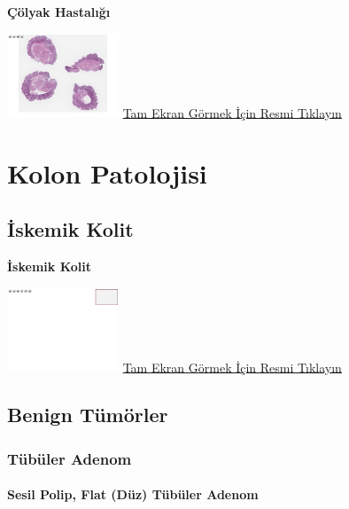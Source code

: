 \documentclass[
  letterpaper,
  DIV=11,
  numbers=noendperiod]{scrreprt}
\begin{document}
\textbf{Çölyak Hastalığı}

\href{https://images.patolojiatlasi.com/celiac-disease/HE.html}{\includegraphics[width=0.25\textwidth,height=\textheight]{./screenshots/celiac-disease_screenshot.png}}
\href{https://images.patolojiatlasi.com/celiac-disease/HE.html}{Tam
Ekran Görmek İçin Resmi Tıklayın}

\hypertarget{kolon-patolojisi}{%
\chapter{Kolon Patolojisi}\label{kolon-patolojisi}}

\hypertarget{sec-iskemik-kolit}{%
\section{İskemik Kolit}\label{sec-iskemik-kolit}}

\textbf{İskemik Kolit}

\href{https://images.patolojiatlasi.com/template/HE.html}{\includegraphics[width=0.25\textwidth,height=\textheight]{./screenshots/template_screenshot.png}}
\href{https://images.patolojiatlasi.com/ischemic-colitis/HE.html}{Tam
Ekran Görmek İçin Resmi Tıklayın}

\hypertarget{sec-kolon-benign-tumorler}{%
\section{Benign Tümörler}\label{sec-kolon-benign-tumorler}}

\hypertarget{sec-kolon-tubuler-adenom}{%
\subsection{Tübüler Adenom}\label{sec-kolon-tubuler-adenom}}

\hypertarget{sec-kolon-sesil-polip}{%
\subsubsection{Sesil Polip, Flat (Düz) Tübüler
Adenom}\label{sec-kolon-sesil-polip}}
\end{document}

